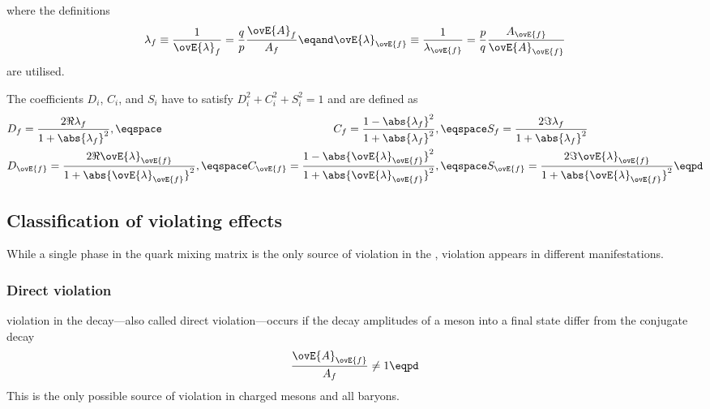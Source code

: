 %
where the definitions
%
\begin{equation}\label{eq:cpv_theory:flavour_physics:time_evolution:lambdaf}
  \lambda_f               \equiv \frac{1}{\ovE{\lambda}_f}   = \frac{q}{p} \frac{\ovE{A}_f}{A_f} \eqand 
  \ovE{\lambda}_{\ovE{f}} \equiv \frac{1}{\lambda_{\ovE{f}}} = \frac{p}{q} \frac{A_{\ovE{f}}}{\ovE{A}_{\ovE{f}}}
\end{equation}
%
are utilised.

The \CP coefficients $D_i$, $C_i$, and $S_i$ have to satisfy $D_i^2 + C_i^2 +
S_i^2 = 1$ and are defined as
%
\begin{equation}\label{eq:cpv_theory:flavour_physics:time_evolution:cp_coefficients}
  \begin{alignedat}{2}
    &D_f = \frac{2 \Re \lambda_f}{1+\abs{\lambda_f}^2}, \eqspace 
    &C_f = \frac{1 - \abs{\lambda_f}^2}{1 + \abs{\lambda_f}^2}, \eqspace 
    &S_f = \frac{2 \Im \lambda_f}{1+\abs{\lambda_f}^2} \\
    &D_{\ovE{f}} = \frac{2 \Re \ovE{\lambda}_{\ovE{f}}}{1+\abs{\ovE{\lambda}_{\ovE{f}}}^2}, \eqspace 
    &C_{\ovE{f}} = \frac{1 - \abs{\ovE{\lambda}_{\ovE{f}}}^2}{1 + \abs{\ovE{\lambda}_{\ovE{f}}}^2}, \eqspace 
    &S_{\ovE{f}} = \frac{2 \Im \ovE{\lambda}_{\ovE{f}}}{1+\abs{\ovE{\lambda}_{\ovE{f}}}^2}\eqpd \\
  \end{alignedat}
\end{equation}
%

\subsection[Classification of \CP violating effects]{Classification of \CPbfsf violating effects}
\label{sec:cpv_theory:flavour_physics:cpv_classification}

While a single phase in the \CKM quark mixing matrix is the only source of \CP
violation in the \SM, \CP violation appears in different manifestations.

\subsubsection[Direct \CP violation]{Direct \CPbfsf violation}
\label{sec:cpv_theory:flavour_physics:cpv_classification:direct}

\CP violation in the decay---also called direct \CP violation---occurs if the
decay amplitudes of a meson into a final state differ from the \CP conjugate
decay
%
\begin{equation}
  \frac{\ovE{A}_{\ovE{f}}}{A_f} \neq 1 \eqpd
\end{equation}
%
This is the only possible source of \CP violation in charged mesons and all
baryons.

